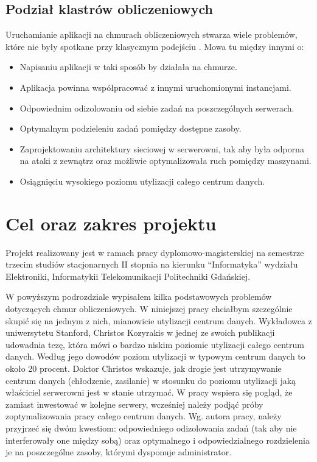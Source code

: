 \documentclass[10pt,a4paper,titlepage,twoside]{report}
\begin{document}
\subsection{Podział klastrów obliczeniowych}\indent \indent Uruchamianie aplikacji na chmurach obliczeniowych stwarza wiele problemów, które nie były spotkane przy klasycznym podejściu \cite{ad14}. Mowa tu między innymi o:
\begin{itemize}
	\item Napisaniu aplikacji w taki sposób by działała na chmurze.
	\item Aplikacja powinna współpracować z innymi uruchomionymi instancjami.
	\item Odpowiednim odizolowaniu od siebie zadań na poszczególnych serwerach.
	\item Optymalnym podzieleniu zadań pomiędzy dostępne zasoby.
	\item Zaprojektowaniu architektury sieciowej w serwerowni, tak aby była odporna na ataki z zewnątrz oraz możliwie optymalizowała ruch pomiędzy maszynami.
	\item Osiągnięciu wysokiego poziomu utylizacji całego centrum danych.
\end{itemize}

\section{Cel oraz zakres projektu}
\indent \indent Projekt realizowany jest w ramach pracy dyplomowo-magisterskiej na semestrze trzecim studiów stacjonarnych II stopnia na kierunku “Informatyka” wydziału Elektroniki, Informatykii Telekomunikacji Politechniki Gdańskiej.

W powyższym podrozdziale wypisałem kilka podstawowych problemów dotyczących chmur obliczeniowych. W niniejszej pracy chciałbym szczególnie skupić się na jednym z nich, mianowicie utylizacji centrum danych. Wykładowca z uniwersytetu Stanford, Christos Kozyrakis w jednej ze swoich publikacji \cite{ad3} udowadnia tezę, która mówi o bardzo niskim poziomie utylizacji całego centrum danych. Według jego dowodów poziom utylizacji w typowym centrum danych to około 20 procent. Doktor Christos wskazuje, jak drogie jest utrzymywanie centrum danych (chłodzenie, zasilanie) w stosunku do poziomu utylizacji jaką właściciel serwerowni jest w stanie utrzymać. W pracy wspiera się pogląd, że zamiast inwestować w kolejne serwery, wcześniej należy podjąć próby zoptymalizowania pracy całego centrum danych. Wg. autora pracy, należy przyjrzeć się dwóm kwestiom: odpowiedniego odizolowania zadań (tak aby nie interferowały one między sobą) oraz optymalnego i odpowiedzialnego rozdzielenia je na poszczególne zasoby, którymi dysponuje administrator.
\end{document}
